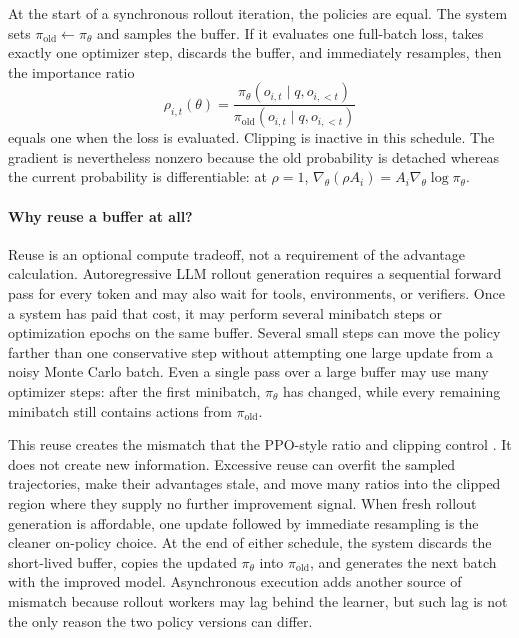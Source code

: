 At the start of a synchronous rollout iteration, the policies are equal. The system sets
$\pi_{\mathrm{old}}\leftarrow\pi_\theta$ and samples the buffer. If it evaluates one
full-batch loss, takes exactly one optimizer step, discards the buffer, and immediately
resamples, then the importance ratio
\begin{equation}
  \rho_{i,t}(\theta)
  = \frac{\pi_\theta(o_{i,t}\mid q,o_{i,<t})}
         {\pi_{\mathrm{old}}(o_{i,t}\mid q,o_{i,<t})}
  \label{eq:rollout-buffer-importance-ratio}
\end{equation}
equals one when the loss is evaluated. Clipping is inactive in this schedule. The gradient
is nevertheless nonzero because the old probability is detached whereas the current
probability is differentiable: at $\rho=1$,
$\nabla_\theta(\rho A_i)=A_i\nabla_\theta\log\pi_\theta$.

\paragraph{Why reuse a buffer at all?}
Reuse is an optional compute tradeoff, not a requirement of the advantage calculation.
Autoregressive LLM rollout generation requires a sequential forward pass for every token
and may also wait for tools, environments, or verifiers. Once a system has paid that cost,
it may perform several minibatch steps or optimization epochs on the same buffer. Several
small steps can move the policy farther than one conservative step without attempting one
large update from a noisy Monte Carlo batch. Even a single pass over a large buffer may use
many optimizer steps: after the first minibatch, $\pi_\theta$ has changed, while every
remaining minibatch still contains actions from $\pi_{\mathrm{old}}$.

This reuse creates the mismatch that the PPO-style ratio and clipping control
\citep{schulman2017ppo}. It does not create new information. Excessive reuse can overfit the
sampled trajectories, make their advantages stale, and move many ratios into the clipped
region where they supply no further improvement signal. When fresh rollout generation is
affordable, one update followed by immediate resampling is the cleaner on-policy choice.
At the end of either schedule, the system discards the short-lived buffer, copies the
updated $\pi_\theta$ into $\pi_{\mathrm{old}}$, and generates the next batch with the
improved model. Asynchronous execution adds another source of mismatch because rollout
workers may lag behind the learner, but such lag is not the only reason the two policy
versions can differ.

